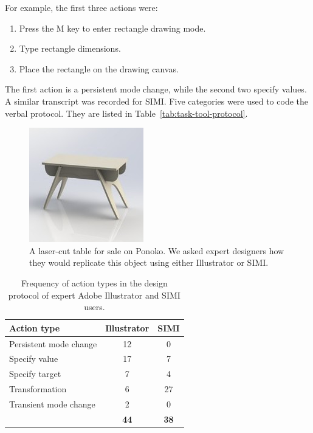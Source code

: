 \begin{samepage}
For example, the first three actions were:

\begin{enumerate}
\item Press the M key to enter rectangle drawing mode.
\item Type rectangle dimensions.
\item Place the rectangle on the drawing canvas.
\end{enumerate}
\end{samepage}

The first action is a persistent mode change, while the second two
specify values. A similar transcript was recorded for SIMI. Five
categories were used to code the verbal protocol. They are listed in
Table~\ref{tab:task-tool-protocol}.



\begin{figure}[h]
  \centering
  \includegraphics[width=0.4\linewidth]{img/table.jpg}
  \caption{A laser-cut table for sale on Ponoko. We asked expert
    designers how they would replicate this object using either
    Illustrator or SIMI.}
  \label{fig:table}
\end{figure}

\begin{table}[h]
  \centering
  \begin{tabular}{ l c c }
    \textbf{Action type} & \textbf{Illustrator} & \textbf{SIMI} \\
    \hline
    Persistent mode change & 12 & 0 \\
    Specify value & 17 & 7 \\
    Specify target & 7 & 4 \\
    Transformation & 6 & 27 \\
    Transient mode change & 2 & 0 \\
    \hline
    & \textbf{44} & \textbf{38} \\
  \end{tabular}
  \caption{Frequency of action types in the design protocol of expert
    Adobe Illustrator and SIMI users. }
  \label{tab:expert}
\end{table}

